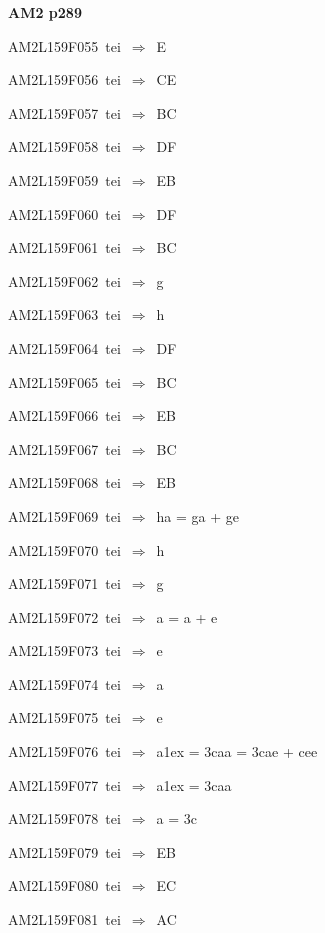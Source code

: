 \par\vfill\eject
{\bf\hfill AM2 p289\hfill\hbox{}}\par\bigskip
{\sixrm AM2L159F055\ {\sixit tei}\ }$\Rightarrow$\ E\par\smallskip
{\sixrm AM2L159F056\ {\sixit tei}\ }$\Rightarrow$\ CE\par\smallskip
{\sixrm AM2L159F057\ {\sixit tei}\ }$\Rightarrow$\ BC\par\smallskip
{\sixrm AM2L159F058\ {\sixit tei}\ }$\Rightarrow$\ DF\par\smallskip
{\sixrm AM2L159F059\ {\sixit tei}\ }$\Rightarrow$\ EB\par\smallskip
{\sixrm AM2L159F060\ {\sixit tei}\ }$\Rightarrow$\ DF\par\smallskip
{\sixrm AM2L159F061\ {\sixit tei}\ }$\Rightarrow$\ BC\par\smallskip
{\sixrm AM2L159F062\ {\sixit tei}\ }$\Rightarrow$\ {\tenit g}\par\smallskip
{\sixrm AM2L159F063\ {\sixit tei}\ }$\Rightarrow$\ {\tenit h}\par\smallskip
{\sixrm AM2L159F064\ {\sixit tei}\ }$\Rightarrow$\ DF\par\smallskip
{\sixrm AM2L159F065\ {\sixit tei}\ }$\Rightarrow$\ BC\par\smallskip
{\sixrm AM2L159F066\ {\sixit tei}\ }$\Rightarrow$\ EB\par\smallskip
{\sixrm AM2L159F067\ {\sixit tei}\ }$\Rightarrow$\ BC\par\smallskip
{\sixrm AM2L159F068\ {\sixit tei}\ }$\Rightarrow$\ EB\par\smallskip
{\sixrm AM2L159F069\ {\sixit tei}\ }$\Rightarrow$\ {\tenit ha} = {\tenit ga} + {\tenit ge}\par\smallskip
{\sixrm AM2L159F070\ {\sixit tei}\ }$\Rightarrow$\ {\tenit h}\par\smallskip
{\sixrm AM2L159F071\ {\sixit tei}\ }$\Rightarrow$\ {\tenit g}\par\smallskip
{\sixrm AM2L159F072\ {\sixit tei}\ }$\Rightarrow$\ {\tenit a} = {\tenit a} + {\tenit e}\par\smallskip
{\sixrm AM2L159F073\ {\sixit tei}\ }$\Rightarrow$\ {\tenit e}\par\smallskip
{\sixrm AM2L159F074\ {\sixit tei}\ }$\Rightarrow$\ {\tenit a}\par\smallskip
{\sixrm AM2L159F075\ {\sixit tei}\ }$\Rightarrow$\ {\tenit e}\par\smallskip
{\sixrm AM2L159F076\ {\sixit tei}\ }$\Rightarrow$\ {\tenit a}\raise1ex\hbox{} = 3{\tenit caa} = 3{\tenit cae} + {\tenit cee}\par\smallskip
{\sixrm AM2L159F077\ {\sixit tei}\ }$\Rightarrow$\ {\tenit a}\raise1ex\hbox{} = 3{\tenit caa}\par\smallskip
{\sixrm AM2L159F078\ {\sixit tei}\ }$\Rightarrow$\ {\tenit a} = 3{\tenit c}\par\smallskip
{\sixrm AM2L159F079\ {\sixit tei}\ }$\Rightarrow$\ EB\par\smallskip
{\sixrm AM2L159F080\ {\sixit tei}\ }$\Rightarrow$\ EC\par\smallskip
{\sixrm AM2L159F081\ {\sixit tei}\ }$\Rightarrow$\ AC\par\smallskip

